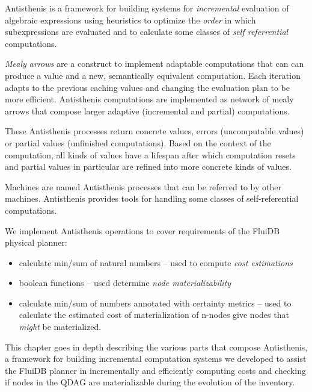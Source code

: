 

\begin{summary}
\item Antisthenis is a framework for building systems for
  \emph{incremental} evaluation of algebraic expressions using
  heuristics to optimize the \emph{order} in which subexpressions are
  evaluated and to calculate some classes of \emph{self referrential}
  computations.
\item \emph{Mealy arrows} are a construct to implement adaptable
  computations that can can produce a value and a new, semantically
  equivalent computation. Each iteration adapts to the previous
  caching values and changing the evaluation plan to be more
  efficient. Antisthenis computations are implemented as network of
  mealy arrows that compose larger adaptive (incremental and partial)
  computations.
\item These Antisthenis processes return concrete values, errors
  (uncomputable values) or partial values (unfinished
  computations). Based on the context of the computation, all kinds of
  values have a lifespan after which computation resets and partial
  values in particular are refined into more concrete kinds of values.
\item Machines are named Antisthenis processes that can be referred to
  by other machines. Antisthenis provides tools for handling some
  classes of self-referential computations.
\item We implement Antisthenis operations to cover requirements of the
  FluiDB physical planner:

  \begin{itemize}
  \item calculate min/sum of natural numbers -- used to compute
    \emph{cost estimations}
  \item boolean functions -- used determine \emph{node materializability}
  \item calculate min/sum of numbers annotated with certainty metrics
    -- used to calculate the estimated cost of materialization of
   n-nodes give nodes that \emph{might} be materialized.
  \end{itemize}
\end{summary}

This chapter goes in depth describing the various parts that compose
Antisthenis, a framework for building incremental computation systems
we developed to assist the FluiDB planner in incrementally and
efficiently computing costs and checking if nodes in the QDAG are
materializable during the evolution of the inventory.

